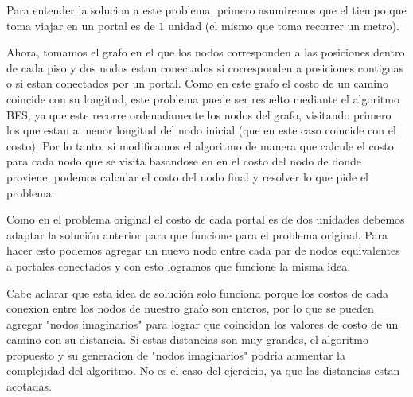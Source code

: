 Para entender la solucion a este problema, primero asumiremos que el tiempo que toma viajar en un portal es de $1$ unidad (el mismo que toma recorrer un metro).

Ahora, tomamos el grafo en el que los nodos corresponden a las posiciones dentro de cada piso y dos nodos estan conectados si corresponden a posiciones contiguas o si estan conectados por un portal.
Como en este grafo el costo de un camino coincide con su longitud, este problema puede ser resuelto mediante el algoritmo BFS, ya que este recorre ordenadamente los nodos del grafo, visitando primero los que estan a menor longitud del nodo inicial (que en este caso coincide con el costo). Por lo tanto, si modificamos el algoritmo de manera que calcule el costo para cada nodo que se visita basandose en en el costo del nodo de donde proviene, podemos calcular el costo del nodo final y resolver lo que pide el problema.


Como en el problema original el costo de cada portal es de dos unidades debemos adaptar la solución anterior para que funcione para el problema original. Para hacer esto podemos agregar un nuevo nodo entre cada par de nodos equivalentes a portales conectados y con esto logramos que funcione la misma idea.

Cabe aclarar que esta idea de solución solo funciona porque los costos de cada conexion entre los nodos de nuestro grafo son enteros, por lo que se pueden agregar "nodos imaginarios" para lograr que coincidan los valores de costo de un camino con su distancia. Si estas distancias son muy grandes, el algoritmo propuesto y su generacion de "nodos imaginarios" podria aumentar la complejidad del algoritmo. No es el caso del ejercicio, ya que las distancias estan acotadas.
